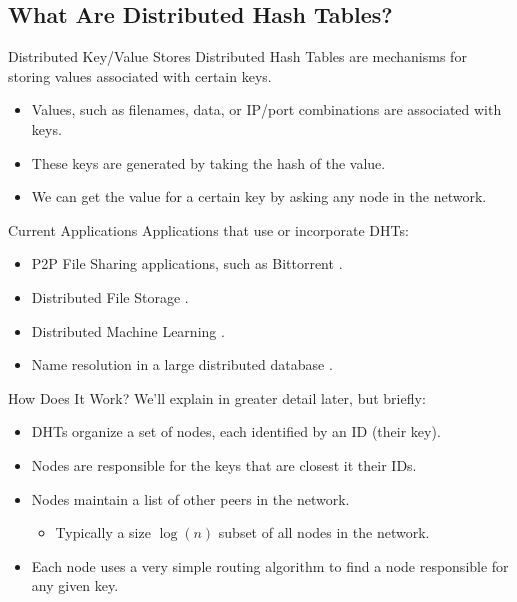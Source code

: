 \documentclass[11pt]{beamer}
\begin{document}
\subsection{What Are Distributed Hash Tables?}

\begin{frame}{Distributed Key/Value Stores}
	\alert{Distributed Hash Tables} are mechanisms for storing values associated with certain keys.
	\begin{itemize}
		\item Values, such as filenames, data, or IP/port combinations are associated with keys.
		\item These keys are generated by taking the hash of the value.
		\item We can get the value for a certain key by asking any node in the network.
	\end{itemize}
\end{frame}


\begin{frame}{Current Applications}
	Applications that use or incorporate DHTs:
	\begin{itemize}
		\item P2P File Sharing applications, such as Bittorrent \cite{bittorrent} \cite{mainline}.
		\item Distributed File Storage \cite{CFS}.
		\item Distributed Machine Learning \cite{liparameter}.
		\item Name resolution in a large distributed database \cite{Mateescu2011440}.
	\end{itemize}
\end{frame}


\begin{frame}{How Does It Work?}
	We'll explain in greater detail later, but briefly:
	\begin{itemize}
		\item DHTs organize a set of nodes, each identified by an \alert{ID} (their key). 
		\item Nodes are responsible for the keys that are closest it their IDs.
		\item Nodes maintain a list of other peers in the network.
		\begin{itemize}
			\item Typically a size $ \log(n)$ subset of all nodes in the network.
		\end{itemize}
		\item Each node uses a very simple routing algorithm to find a node responsible for any given key.  %
	\end{itemize}
\end{frame}
\end{document}
